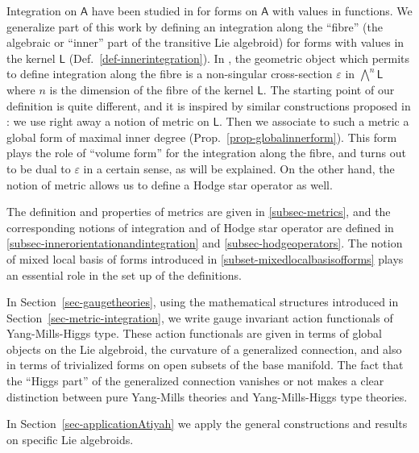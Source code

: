 \documentclass[number]{elsarticle}
\theoremstyle{definition}
\theoremstyle{remark}
\numberwithin{equation}{section}
\begin{document}
Integration on ${{{{\mathbf{\mathsf{{A}}}}}}}$ have been studied in \cite{Kuba96a,MR1908998} for forms on ${{{{\mathbf{\mathsf{{A}}}}}}}$ with values in functions. We generalize part of this work by defining an integration along the ``fibre'' (the algebraic or ``inner'' part of the transitive Lie algebroid) for forms with values in the kernel ${{{{\mathbf{\mathsf{{L}}}}}}}$ (Def.~\ref{def-innerintegration}). In \cite{Kuba96a,MR1908998}, the geometric object which permits to define integration along the fibre is a non-singular cross-section $\varepsilon$ in ${{\textstyle\bigwedge}}^n {{{{\mathbf{\mathsf{{L}}}}}}}$ where $n$ is the dimension of the fibre of the kernel ${{{{\mathbf{\mathsf{{L}}}}}}}$. The starting point of our definition is quite different, and it is inspired by similar constructions proposed in \cite{Mass15}: we use right away a notion of metric on ${{{{\mathbf{\mathsf{{L}}}}}}}$. Then we associate to such a metric a global form of maximal inner degree (Prop.~\ref{prop-globalinnerform}). This form plays the role of ``volume form'' for the integration along the fibre, and turns out to be dual to $\varepsilon$ in a certain sense, as will be explained. On the other hand, the notion of metric allows us to define a Hodge star operator as well. 

The definition and properties of metrics are given in \ref{subsec-metrics}, and the corresponding notions of integration and of Hodge star operator are defined in \ref{subsec-innerorientationandintegration} and \ref{subsec-hodgeoperators}. The notion of mixed local basis of forms introduced in \ref{subset-mixedlocalbasisofforms} plays an essential role in the set up of the definitions.

In Section~\ref{sec-gaugetheories}, using the mathematical structures introduced in Section~\ref{sec-metric-integration}, we write gauge invariant action functionals of Yang-Mills-Higgs type. These action functionals are given in terms of global objects on the Lie algebroid, the curvature of a generalized connection, and also in terms of trivialized forms on open subsets of the base manifold. The fact that the ``Higgs part'' of the generalized connection vanishes or not makes a clear distinction between pure Yang-Mills theories and Yang-Mills-Higgs type theories.

In Section~\ref{sec-applicationAtiyah} we apply the general constructions and results on specific Lie algebroids.
\end{document}

